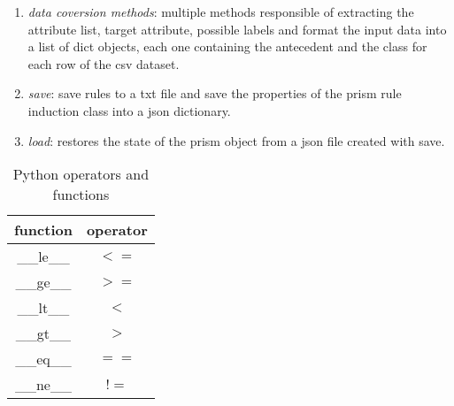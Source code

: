 \begin{enumerate}
\begin{enumerate}
            \item \emph{data coversion methods}: multiple methods responsible of extracting the attribute list, target attribute, possible labels and format the input data into a list of dict objects, each one containing the antecedent and the class for each row of the csv dataset.
            \item \emph{save}: save rules to a txt file and save the properties of the prism rule induction class into a json dictionary.
            \item \emph{load}: restores the state of the prism object from a json file created with save.
        \end{enumerate}
\end{enumerate}

\begin{table}
\centering
\begin{tabular}{| c | c |}
\label{python operators}
    function & operator \\
    \hline
    \hline
    \_\_le\_\_ & $<=$ \\
    \_\_ge\_\_ & $>=$ \\
    \_\_lt\_\_ & $<$ \\
    \_\_gt\_\_ & $>$ \\
    \_\_eq\_\_ & $==$ \\
    \_\_ne\_\_ & $!=$ \\
    \hline
\end{tabular}
\caption{\label{tab:python operators}Python operators and functions}
\end{table}